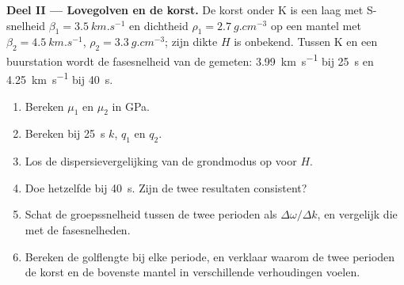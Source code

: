 \begin{problem}
\noindent\textbf{Deel II --- Lovegolven en de korst.} De korst onder K is een
laag met S-snelheid $\beta_1 = \qty{3.5}{km.s^{-1}}$ en dichtheid
$\rho_1 = \qty{2.7}{g.cm^{-3}}$ op een mantel met $\beta_2 =
\qty{4.5}{km.s^{-1}}$, $\rho_2 = \qty{3.3}{g.cm^{-3}}$; zijn dikte $H$ is
onbekend. Tussen K en een buurstation wordt de fasesnelheid van de 
gemeten: \qty{3.99}{km.s^{-1}} bij \qty{25}{s} en \qty{4.25}{km.s^{-1}} bij
\qty{40}{s}.
\begin{enumerate}[resume]
  \item Bereken $\mu_1$ en $\mu_2$ in \unit{GPa}.
  \item Bereken bij \qty{25}{s} $k$, $q_1$ en $q_2$.
  \item Los de dispersievergelijking van de grondmodus op voor $H$.
  \item Doe hetzelfde bij \qty{40}{s}. Zijn de twee resultaten consistent?
  \item Schat de groepssnelheid tussen de twee perioden als
        $\Delta\omega/\Delta k$, en vergelijk die met de fasesnelheden.
  \item Bereken de golflengte bij elke periode, en verklaar waarom de twee
        perioden de korst en de bovenste mantel in verschillende verhoudingen
        voelen.
\end{enumerate}


\end{problem}
